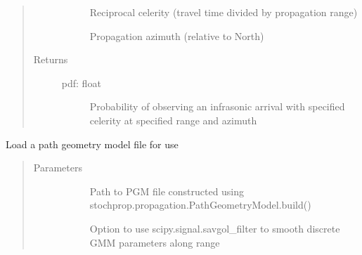 \documentclass[letterpaper,10pt,english]{sphinxmanual}
\begin{document}
\begin{fulllineitems}
\begin{fulllineitems}
\begin{quote}
\begin{description}
\begin{description}
\item[{}] \leavevmode
Reciprocal celerity (travel time divided by propagation range)

\item[{}] \leavevmode
Propagation azimuth (relative to North)

\end{description}

\item[{Returns}] \leavevmode\begin{description}
\item[{pdf: float}] \leavevmode
Probability of observing an infrasonic arrival with specified celerity at specified range and azimuth

\end{description}

\end{description}\end{quote}

\end{fulllineitems}


\begin{fulllineitems}
\label{\detokenize{stochprop.propagation:stochprop.propagation.PathGeometryModel.load}}
Load a path geometry model file for use
\begin{quote}\begin{description}
\item[{Parameters}] \leavevmode\begin{description}
\item[{}] \leavevmode
Path to PGM file constructed using stochprop.propagation.PathGeometryModel.build()

\item[{}] \leavevmode
Option to use scipy.signal.savgol\_filter to smooth discrete GMM parameters along range

\end{description}

\end{description}\end{quote}

\end{fulllineitems}


\end{fulllineitems}
\end{document}
